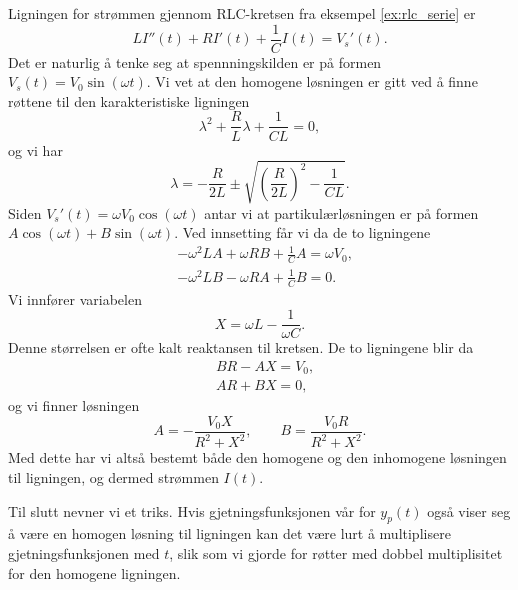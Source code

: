 \documentclass{article}
\theoremstyle{definition}
\newenvironment{ex}
{\pushQED{\qed}\renewcommand{\qedsymbol}{$\triangle$}\exx}
{\popQED\endexx}
\theoremstyle{remark}
\begin{document}
\begin{multicols*}{2}
\begin{ex}
  Ligningen for strømmen gjennom RLC-kretsen fra eksempel \ref{ex:rlc_serie} er
  \begin{equation*}
    L I''(t) + R I'(t) + \frac{1}{C} I(t) = V_s'(t).
  \end{equation*}
  Det er naturlig å tenke seg at spennningskilden er på formen $V_s(t) = V_0 \sin(\omega t)$. Vi vet at den homogene løsningen er gitt ved å finne røttene til den karakteristiske ligningen
  \begin{equation*}
    \lambda^2 + \frac{R}{L} \lambda + \frac{1}{CL} = 0,
  \end{equation*}
  og vi har 
  \begin{equation*}
    \lambda = -\frac{R}{2L} \pm \sqrt{\left(\frac{R}{2L}\right)^2 - \frac{1}{CL}}.  
  \end{equation*}
  Siden $V_s'(t) = \omega V_0 \cos(\omega t)$ antar vi at partikulærløsningen er på formen $A \cos(\omega t) + B\sin(\omega t)$. Ved innsetting får vi da de to ligningene
  \begin{equation*}
    \begin{split}
      & - \omega^2 L A + \omega R B + \frac{1}{C} A = \omega V_0, \\
      & - \omega^2 L B - \omega R A + \frac{1}{C} B = 0.
    \end{split}
  \end{equation*}
  Vi innfører variabelen
  \begin{equation*}
    X = \omega L - \frac{1}{\omega C}.
  \end{equation*}
  Denne størrelsen er ofte kalt reaktansen til kretsen. De to ligningene blir da
  \begin{equation*}
    \begin{split}
      & BR - AX = V_0, \\
      & AR + BX = 0,
    \end{split}
  \end{equation*}
  og vi finner løsningen
  \begin{equation*}
    A = -\frac{V_0 X}{R^2 + X^2}, \qquad B = \frac{V_0 R}{R^2 + X^2}.
  \end{equation*}
  Med dette har vi altså bestemt både den homogene og den inhomogene løsningen til ligningen, og dermed strømmen $I(t)$.
\end{ex}

Til slutt nevner vi et triks. Hvis gjetningsfunksjonen vår for $y_p(t)$ også viser seg å være en homogen løsning til ligningen kan det være lurt å multiplisere gjetningsfunksjonen med $t$, slik som vi gjorde for røtter med dobbel multiplisitet for den homogene ligningen.


\end{multicols*}
\end{document}

